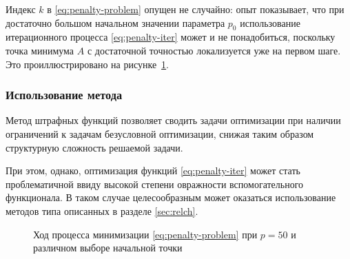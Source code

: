 Индекс $k$ в \eqref{eq:penalty-problem} опущен не случайно: опыт
показывает, что при достаточно большом начальном значении параметра
$p_0$ использование итерационного процесса \eqref{eq:penalty-iter}
может и не понадобиться, поскольку точка минимума $A$ с достаточной
точностью локализуется уже на первом шаге. Это проиллюстрировано на
рисунке \ref{fig:penalty}.

\subsubsection{Использование метода}

Метод штрафных функций позволяет сводить задачи оптимизации при
наличии ограничений к задачам безусловной оптимизации, снижая таким
образом структурную сложность решаемой задачи.

При этом, однако, оптимизация функций \eqref{eq:penalty-iter} может
стать проблематичной ввиду высокой степени овражности вспомогательного
функционала. В таком случае целесообразным может оказаться
использование методов типа описанных в разделе \ref{sec:relch}.

\begin{figure}[!thb]
  \centering
  \caption[Метод штрафных функций]{Ход процесса минимизации
    \eqref{eq:penalty-problem} при $p=50$ и различном выборе начальной
    точки}
  \label{fig:penalty}
\end{figure}